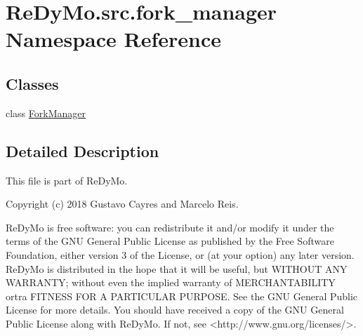 \hypertarget{namespaceReDyMo_1_1src_1_1fork__manager}{}\section{Re\+Dy\+Mo.\+src.\+fork\+\_\+manager Namespace Reference}
\label{namespaceReDyMo_1_1src_1_1fork__manager}
\subsection*{Classes}
\begin{DoxyCompactItemize}
\item 
class \mbox{\hyperlink{classReDyMo_1_1src_1_1fork__manager_1_1ForkManager}{Fork\+Manager}}
\end{DoxyCompactItemize}


\subsection{Detailed Description}
\begin{DoxyVerb}This file is part of ReDyMo.

Copyright (c) 2018  Gustavo Cayres and Marcelo Reis.

ReDyMo is free software: you can redistribute it and/or modify it
under the terms of the GNU General Public License as published by the
Free Software Foundation, either version 3 of the License, or (at your
option) any later version.
ReDyMo is distributed in the hope that it will be useful, but WITHOUT
ANY WARRANTY; without even the implied warranty of MERCHANTABILITY ortra
FITNESS FOR A PARTICULAR PURPOSE. See the GNU General Public License
for more details.
You should have received a copy of the GNU General Public License along
with ReDyMo. If not, see <http://www.gnu.org/licenses/>.\end{DoxyVerb}
 